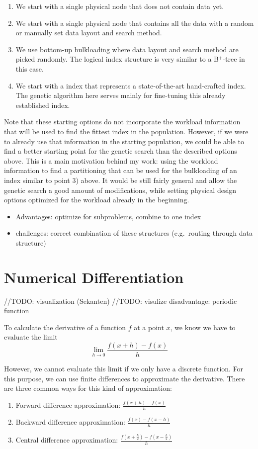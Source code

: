 \begin{enumerate}
    \item We start with a single physical node that does not contain data yet.
    \item We start with a single physical node that contains all the data with a random or manually set data layout and search method.
    \item We use bottom-up bulkloading where data layout and search method are picked randomly. The logical index structure is very similar to a B$^+$-tree in this case.
    \item We start with a index that represents a state-of-the-art hand-crafted index. The genetic algorithm here serves mainly for fine-tuning this already established index.
\end{enumerate}
\noindent Note that these starting options do not incorporate the workload information that will be used to find the fittest index in the population. However, if we were to already use that information in the starting population, we could be able to find a better starting point for the genetic search than the described options above. This is a main motivation behind my work: using the workload information to find a partitioning that can be used for the bulkloading of an index similar to point 3) above. It would be still fairly general and allow the genetic search a good amount of modifications, while setting physical design options optimized for the workload already in the beginning.

\begin{itemize}
    \item Advantages: optimize for subproblems, combine to one index
    \item challenges: correct combination of these structures (e.g.~routing through data structure)
\end{itemize}


\section{Numerical Differentiation}\label{bg:numerical}
//TODO: visualization (Sekanten)
//TODO: visulize disadvantage: periodic function

To calculate the derivative of a function $f$ at a point $x$, we know we have to evaluate the limit 
$$
\lim_{h \rightarrow 0} \frac{f(x+h) - f(x)}{h}
$$

However, we cannot evaluate this limit if we only have a discrete function. For this purpose, we can use finite differences to approximate the derivative. There are three common ways for this kind of approximation:
\begin{enumerate}
    \item Forward difference approximation: $\frac{f(x + h) - f(x)}{h}$
    \item Backward difference approximation: $\frac{f(x) - f(x-h)}{h}$
    \item Central difference approximation: $\frac{f(x + \frac{h}{2}) - f(x - \frac{h}{2})}{h}$
\end{enumerate}

